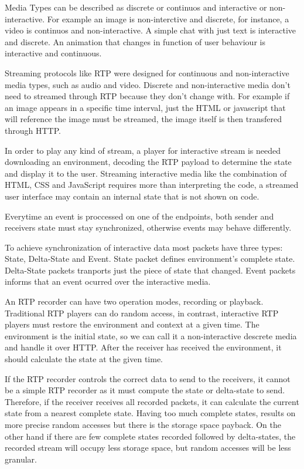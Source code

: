 	Media Types can be described as discrete or continuos and interactive or non-interactive. For example an image is non-interctive and discrete, for instance, a video is continuos and non-interactive. A simple chat with just text is interactive and discrete. An animation that changes in function of user behaviour is interactive and continuous.

	Streaming protocols like \ac {RTP} were designed for continuous and non-interactive media types, such as audio and video. Discrete and non-interactive media don't need to streamed through \ac{RTP} because they don't change with. For example if an image appears in a specific time interval, just the \ac{HTML} or javascript that will reference the image must be streamed, the image itself is then transfered through \ac{HTTP}.

	In order to play any kind of stream, a player for interactive stream is needed downloading an environment, decoding the \ac{RTP} payload to determine the state and display it to the user. Streaming interactive media like the combination of \ac{HTML}, \ac{CSS} and JavaScript requires more than interpreting the code, a streamed user interface may contain an internal state that is not shown on code.

	Everytime an event is proccessed on one of the endpoints, both sender and receivers state must stay synchronized, otherwise events may behave differently.

	To achieve synchronization of interactive data most packets have three types: State, Delta-State and Event. State packet defines environment's complete state. Delta-State packets tranports just the piece of state that changed. Event packets informs that an event ocurred over the interactive media. 

	An \ac{RTP} recorder can have two operation modes, recording or playback. Traditional \ac{RTP} players can do random access, in contrast, interactive \ac{RTP} players must restore the environment and context at a given time. The environment is the initial state, so we can call it a non-interactive descrete media and handle it over \ac{HTTP}. After the receiver has received the environment, it should calculate the state at the given time. 

	If the \ac{RTP} recorder controls the correct data to send to the receivers, it cannot be a simple \ac{RTP} recorder as it must compute the state or delta-state to send. Therefore, if the receiver receives all recorded packets, it can calculate the current state from a nearest complete state. Having too much complete states, results on more precise random accesses but there is the storage space payback. On the other hand if there are few complete states recorded followed by delta-states, the recorded stream will occupy less storage space, but random accesses will be less granular.

